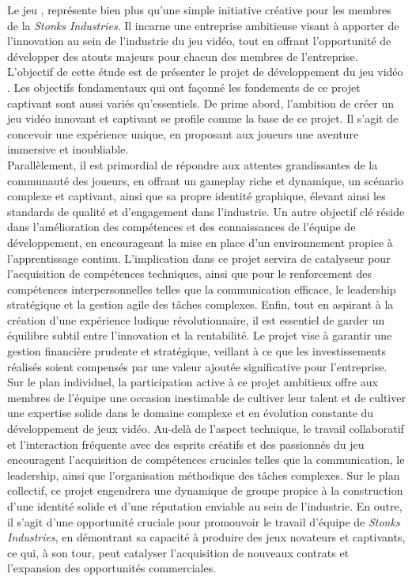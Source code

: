 Le jeu \textit{\gameName}, représente bien plus qu'une simple initiative créative pour les membres de la \textit{Stonks Industries}. 
Il incarne une entreprise ambitieuse visant à apporter de l’innovation au sein de l'industrie du jeu vidéo, 
tout en offrant l'opportunité de développer des atouts majeurs pour chacun des membres de l’entreprise.
\\

L'objectif de cette étude est de présenter le projet de développement du jeu vidéo \textit{\gameName}.
Les objectifs fondamentaux qui ont façonné les fondements de ce projet captivant sont aussi variés qu'essentiels.
De prime abord, l'ambition de créer un jeu vidéo innovant et captivant se profile comme la base de ce projet.
Il s'agit de concevoir une expérience unique, en proposant aux joueurs une aventure immersive et inoubliable.
\\

Parallèlement, il est primordial de répondre aux attentes grandissantes de la communauté des joueurs, en offrant un gameplay riche et dynamique, un scénario complexe et captivant, ainsi que sa propre identité graphique, élevant ainsi les standards de qualité et d'engagement dans l'industrie.
Un autre objectif clé réside dans l'amélioration des compétences et des connaissances de l'équipe de développement, en encourageant la mise en place d’un environnement propice à l'apprentissage continu. 
L'implication dans ce projet servira de catalyseur pour l'acquisition de compétences techniques, ainsi que pour le renforcement des compétences interpersonnelles telles que la communication efficace, le leadership stratégique et la gestion agile des tâches complexes.
Enfin, tout en aspirant à la création d'une expérience ludique révolutionnaire, il est essentiel de garder un équilibre subtil entre l'innovation et la rentabilité. 
Le projet vise à garantir une gestion financière prudente et stratégique, veillant à ce que les investissements réalisés soient compensés par une valeur ajoutée significative pour l'entreprise.
\\

Sur le plan individuel, la participation active à ce projet ambitieux offre aux membres de l'équipe une occasion inestimable de cultiver leur talent et de cultiver une expertise solide dans le domaine complexe et en évolution constante du développement de jeux vidéo. 
Au-delà de l'aspect technique, le travail collaboratif et l'interaction fréquente avec des esprits créatifs et des passionnés du jeu encouragent l'acquisition de compétences cruciales telles que la communication, le leadership, ainsi que l'organisation méthodique des tâches complexes.
Sur le plan collectif, ce projet engendrera une dynamique de groupe propice à la construction d'une identité solide et d'une réputation enviable au sein de l'industrie. 
En outre, il s'agit d'une opportunité cruciale pour promouvoir le travail d'équipe de \textit{Stonks Industries}, en démontrant sa capacité à produire des jeux novateurs et captivants, ce qui, à son tour, peut catalyser l'acquisition de nouveaux contrats et l'expansion des opportunités commerciales.
\\

